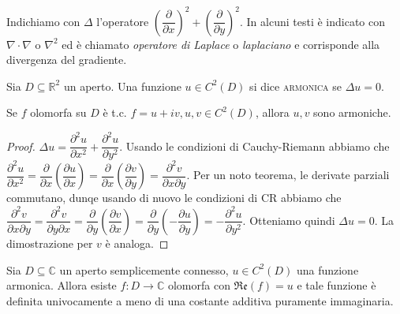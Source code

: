 \begin{defn}
  Indichiamo con $\Delta$ l'operatore $\left(\dfrac{\partial}{\partial x}\right)^2+\left(\dfrac{\partial}{\partial y}\right)^2$. In alcuni testi è indicato con $\nabla \cdot \nabla$ o $\nabla^2$ ed è chiamato \textit{operatore di Laplace} o \textit{laplaciano} e corrisponde alla divergenza del gradiente.
\end{defn}

\begin{defn}
  Sia $D \subseteq \mathbb{R}^2$ un aperto. Una funzione $u \in C^2(D)$ si dice \textsc{armonica} se $\Delta u=0$.
\end{defn}

\begin{thm}
  Se $f$ olomorfa su $D$ è t.c. $f=u+iv, u,v \in C^2(D)$, allora $u, v$ sono armoniche.
\end{thm}

\begin{proof}
  $\Delta u=\dfrac{\partial^2u}{\partial x^2}+\dfrac{\partial^2 u}{\partial y^2}$.
  Usando le condizioni di Cauchy-Riemann abbiamo che $\dfrac{\partial^2u}{\partial x^2}=\dfrac{\partial}{\partial x}\left(\dfrac{\partial u}{\partial x}\right)=\dfrac{\partial}{\partial x}\left(\dfrac{\partial v}{\partial y}\right)=\dfrac{\partial^2v}{\partial x\partial y}$.
  Per un noto teorema, le derivate parziali commutano, dunqe usando di nuovo le condizioni di CR abbiamo che $\dfrac{\partial^2v}{\partial x\partial y}=\dfrac{\partial^2v}{\partial y\partial x}=\dfrac{\partial}{\partial y}\left(\dfrac{\partial v}{\partial x}\right)=\dfrac{\partial}{\partial y}\left(-\dfrac{\partial u}{\partial y}\right)=-\dfrac{\partial^2 u}{\partial y^2}$.
  Otteniamo quindi $\Delta u=0$. La dimostrazione per $v$ è analoga.
\end{proof}

\begin{thm}
  Sia $D \subseteq \mathbb{C}$ un aperto semplicemente connesso, $u \in C^2(D)$ una funzione armonica. Allora esiste $f:D \longrightarrow \mathbb{C}$ olomorfa con $\mathfrak{Re}(f)=u$ e tale funzione è definita univocamente a meno di una costante additiva puramente immaginaria.
\end{thm}

